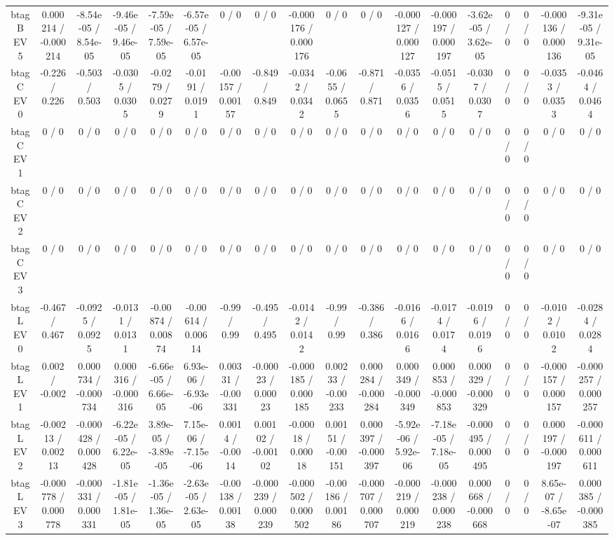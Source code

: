 \documentclass[10pt]{article}
\begin{document}
\begin{table}[htbp]
\begin{center}
\begin{tabular}{|c|c|c|c|c|c|c|c|c|c|c|c|c|c|c|c|c|c|}
  btag B EV 5 & 0.000214 / -0.000214 & -8.54e-05 / 8.54e-05 & -9.46e-05 / 9.46e-05 & -7.59e-05 / 7.59e-05 & -6.57e-05 / 6.57e-05 & 0 / 0 & 0 / 0 & -0.000176 / 0.000176 & 0 / 0 & 0 / 0 & -0.000127 / 0.000127 & -0.000197 / 0.000197 & -3.62e-05 / 3.62e-05 & 0 / 0 & 0 / 0 & -0.000136 / 0.000136 & -9.31e-05 / 9.31e-05 \\ 
  btag C EV 0 & -0.226 / 0.226 & -0.503 / 0.503 & -0.0305 / 0.0305 & -0.0279 / 0.0279 & -0.0191 / 0.0191 & -0.00157 / 0.00157 & -0.849 / 0.849 & -0.0342 / 0.0342 & -0.0655 / 0.0655 & -0.871 / 0.871 & -0.0356 / 0.0356 & -0.0515 / 0.0515 & -0.0307 / 0.0307 & 0 / 0 & 0 / 0 & -0.0353 / 0.0353 & -0.0464 / 0.0464 \\ 
  btag C EV 1 & 0 / 0 & 0 / 0 & 0 / 0 & 0 / 0 & 0 / 0 & 0 / 0 & 0 / 0 & 0 / 0 & 0 / 0 & 0 / 0 & 0 / 0 & 0 / 0 & 0 / 0 & 0 / 0 & 0 / 0 & 0 / 0 & 0 / 0 \\ 
  btag C EV 2 & 0 / 0 & 0 / 0 & 0 / 0 & 0 / 0 & 0 / 0 & 0 / 0 & 0 / 0 & 0 / 0 & 0 / 0 & 0 / 0 & 0 / 0 & 0 / 0 & 0 / 0 & 0 / 0 & 0 / 0 & 0 / 0 & 0 / 0 \\ 
  btag C EV 3 & 0 / 0 & 0 / 0 & 0 / 0 & 0 / 0 & 0 / 0 & 0 / 0 & 0 / 0 & 0 / 0 & 0 / 0 & 0 / 0 & 0 / 0 & 0 / 0 & 0 / 0 & 0 / 0 & 0 / 0 & 0 / 0 & 0 / 0 \\ 
  btag L EV 0 & -0.467 / 0.467 & -0.0925 / 0.0925 & -0.0131 / 0.0131 & -0.00874 / 0.00874 & -0.00614 / 0.00614 & -0.99 / 0.99 & -0.495 / 0.495 & -0.0142 / 0.0142 & -0.99 / 0.99 & -0.386 / 0.386 & -0.0166 / 0.0166 & -0.0174 / 0.0174 & -0.0196 / 0.0196 & 0 / 0 & 0 / 0 & -0.0102 / 0.0102 & -0.0284 / 0.0284 \\ 
  btag L EV 1 & 0.002 / -0.002 & 0.000734 / -0.000734 & 0.000316 / -0.000316 & -6.66e-05 / 6.66e-05 & 6.93e-06 / -6.93e-06 & 0.00331 / -0.00331 & -0.00023 / 0.00023 & -0.000185 / 0.000185 & 0.00233 / -0.00233 & 0.000284 / -0.000284 & 0.000349 / -0.000349 & 0.000853 / -0.000853 & 0.000329 / -0.000329 & 0 / 0 & 0 / 0 & -0.000157 / 0.000157 & -0.000257 / 0.000257 \\ 
  btag L EV 2 & -0.00213 / 0.00213 & -0.000428 / 0.000428 & -6.22e-05 / 6.22e-05 & 3.89e-05 / -3.89e-05 & 7.15e-06 / -7.15e-06 & 0.0014 / -0.0014 & 0.00102 / -0.00102 & -0.00018 / 0.00018 & 0.00151 / -0.00151 & 0.000397 / -0.000397 & -5.92e-06 / 5.92e-06 & -7.18e-05 / 7.18e-05 & -0.000495 / 0.000495 & 0 / 0 & 0 / 0 & 0.000197 / -0.000197 & -0.000611 / 0.000611 \\ 
  btag L EV 3 & -0.000778 / 0.000778 & -0.000331 / 0.000331 & -1.81e-05 / 1.81e-05 & -1.36e-05 / 1.36e-05 & -2.63e-05 / 2.63e-05 & -0.00138 / 0.00138 & -0.000239 / 0.000239 & -0.000502 / 0.000502 & -0.00186 / 0.00186 & -0.000707 / 0.000707 & -0.000219 / 0.000219 & -0.000238 / 0.000238 & 0.000668 / -0.000668 & 0 / 0 & 0 / 0 & 8.65e-07 / -8.65e-07 & 0.000385 / -0.000385 \\ 

\end{tabular}
\end{center}
\end{table}
\end{document}
